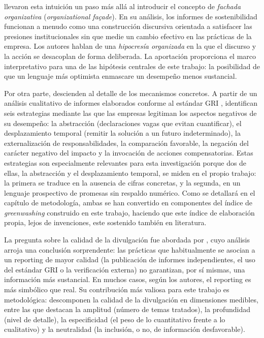 \textcite{cho2015} llevaron esta intuición un paso más allá al introducir el concepto de
\textit{fachada organizativa} (\textit{organizational façade}). En su análisis, los informes
de sostenibilidad funcionan a menudo como una construcción discursiva orientada a satisfacer
las presiones institucionales sin que medie un cambio efectivo en las prácticas de la empresa.
Los autores hablan de una \textit{hipocresía organizada} en la que el discurso y la acción se
desacoplan de forma deliberada. La aportación proporciona el marco interpretativo para una de las hipótesis centrales de este
trabajo: la posibilidad de que un lenguaje más optimista enmascare un desempeño menos
sustancial.

Por otra parte, \textcite{hahn2014}
descienden al detalle de los mecanismos concretos. A partir de un análisis cualitativo de
informes elaborados conforme al estándar GRI \parencite{gri2021}, identifican seis estrategias mediante las que
las empresas legitiman los aspectos negativos de su desempeño: la abstracción (declaraciones
vagas que evitan cuantificar), el desplazamiento temporal (remitir la solución a un futuro
indeterminado), la externalización de responsabilidades, la comparación favorable, la negación
del carácter negativo del impacto y la invocación de acciones compensatorias. Estas estrategias
son especialmente relevantes para esta investigación porque dos de ellas, la abstracción y el
desplazamiento temporal, se miden en el propio trabajo: la primera se
traduce en la ausencia de cifras concretas, y la segunda, en un lenguaje prospectivo de
promesas sin respaldo numérico. Como se detallará en el capítulo de metodología, ambas se han
convertido en componentes del índice de \textit{greenwashing} construido en este trabajo, haciendo que este índice
de elaboración propia, lejos de invenciones, este sostenido también en literatura.

La pregunta sobre la calidad de la divulgación fue abordada por
\textcite{michelon2015}, cuyo análisis arroja una conclusión sorprendente: las prácticas que
habitualmente se asocian a un reporting de mayor calidad (la publicación de informes
independientes, el uso del estándar GRI o la verificación externa) no garantizan, por sí
mismas, una información más sustancial. En muchos casos, según los autores, el reporting es
más simbólico que real. Su contribución más valiosa para este trabajo es
metodológica: descomponen la calidad de la divulgación en dimensiones medibles, entre las que
destacan la amplitud (número de temas tratados), la profundidad (nivel de detalle), la
especificidad (el peso de lo cuantitativo frente a lo cualitativo) y la neutralidad (la
inclusión, o no, de información desfavorable).

